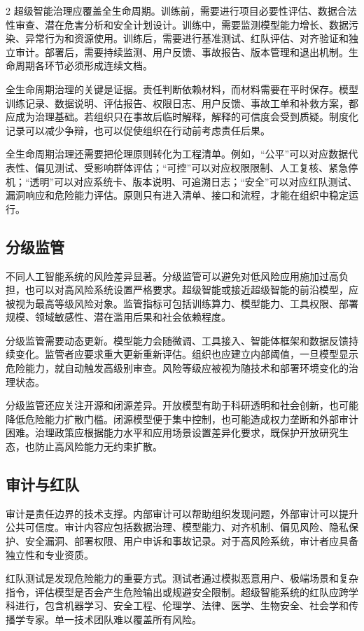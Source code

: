 \documentclass[a4paper,UTF8,zihao=5,twoside]{ctexart}
\begin{document}
\begin{multicols}{2}
超级智能治理应覆盖全生命周期。训练前，需要进行项目必要性评估、数据合法性审查、潜在危害分析和安全计划设计。训练中，需要监测模型能力增长、数据污染、异常行为和资源使用。训练后，需要进行基准测试、红队评估、对齐验证和独立审计。部署后，需要持续监测、用户反馈、事故报告、版本管理和退出机制。生命周期各环节必须形成连续文档。

全生命周期治理的关键是证据。责任判断依赖材料，而材料需要在平时保存。模型训练记录、数据说明、评估报告、权限日志、用户反馈、事故工单和补救方案，都应成为治理基础。若组织只在事故后临时解释，解释的可信度会受到质疑。制度化记录可以减少争辩，也可以促使组织在行动前考虑责任后果。

全生命周期治理还需要把伦理原则转化为工程清单。例如，“公平”可以对应数据代表性、偏见测试、受影响群体评估；“可控”可以对应权限限制、人工复核、紧急停机；“透明”可以对应系统卡、版本说明、可追溯日志；“安全”可以对应红队测试、漏洞响应和危险能力评估。原则只有进入清单、接口和流程，才能在组织中稳定运行。

\subsection{分级监管}

不同人工智能系统的风险差异显著。分级监管可以避免对低风险应用施加过高负担，也可以对高风险系统设置严格要求。超级智能或接近超级智能的前沿模型，应被视为最高等级风险对象。监管指标可包括训练算力、模型能力、工具权限、部署规模、领域敏感性、潜在滥用后果和社会依赖程度。

分级监管需要动态更新。模型能力会随微调、工具接入、智能体框架和数据反馈持续变化。监管者应要求重大更新重新评估。组织也应建立内部阈值，一旦模型显示危险能力，就自动触发高级别审查。风险等级应被视为随技术和部署环境变化的治理状态。

分级监管还应关注开源和闭源差异。开放模型有助于科研透明和社会创新，也可能降低危险能力扩散门槛。闭源模型便于集中控制，也可能造成权力垄断和外部审计困难。治理政策应根据能力水平和应用场景设置差异化要求，既保护开放研究生态，也防止高风险能力无约束扩散。

\subsection{审计与红队}

审计是责任边界的技术支撑。内部审计可以帮助组织发现问题，外部审计可以提升公共可信度。审计内容应包括数据治理、模型能力、对齐机制、偏见风险、隐私保护、安全漏洞、部署权限、用户申诉和事故记录。对于高风险系统，审计者应具备独立性和专业资质。

红队测试是发现危险能力的重要方式。测试者通过模拟恶意用户、极端场景和复杂指令，评估模型是否会产生危险输出或规避安全限制。超级智能系统的红队应跨学科进行，包含机器学习、安全工程、伦理学、法律、医学、生物安全、社会学和传播学专家。单一技术团队难以覆盖所有风险。


\end{multicols}
\end{document}
